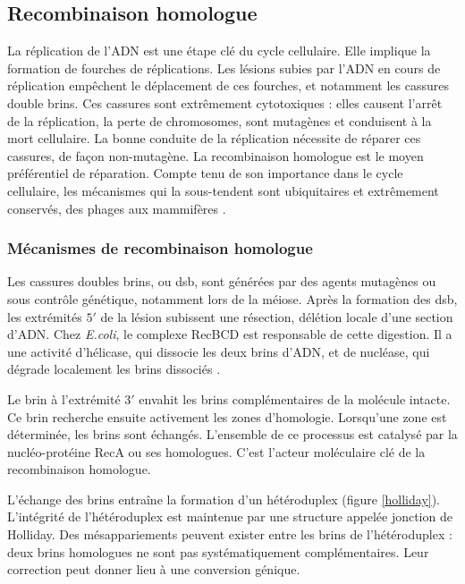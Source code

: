 \documentclass[11pt, oneside]{scrartcl}
\begin{document}
\subsection{Recombinaison homologue}
\label{sec:orgheadline5}

La réplication de l'ADN est une étape clé du cycle cellulaire. Elle implique la
formation de fourches de réplications. Les lésions subies par l'ADN en cours de
réplication empêchent le déplacement de ces fourches, et notamment les cassures
double brins. Ces cassures sont extrêmement cytotoxiques : elles causent l'arrêt
de la réplication, la perte de chromosomes, sont mutagènes et conduisent à la
mort cellulaire. La bonne conduite de la réplication nécessite de réparer ces
cassures, de façon non-mutagène. La recombinaison homologue est le moyen
préférentiel de réparation. Compte tenu de son importance dans le cycle
cellulaire, les mécanismes qui la sous-tendent sont ubiquitaires et extrêmement
conservés, des phages aux mammifères \cite{cromie_recombination_2001}.

\subsubsection{Mécanismes de recombinaison homologue}
\label{sec:orgheadline2}

Les cassures doubles brins, ou \ac{dsb}, sont générées par des agents mutagènes
ou sous contrôle génétique, notamment lors de la méiose. Après la formation des
\ac{dsb}, les extrémités \(5'\) de la lésion subissent une résection, délétion
locale d'une section d'ADN. Chez \emph{E.coli}, le complexe RecBCD est responsable de
cette digestion. Il a une activité d'hélicase, qui dissocie les deux brins
d'ADN, et de nucléase, qui dégrade localement les brins dissociés
\cite{dillingham_recbcd_2008}.

Le brin à l'extrémité \(3'\) envahit les brins complémentaires de la molécule
intacte. Ce brin recherche ensuite activement les zones d'homologie. Lorsqu'une
zone est déterminée, les brins sont échangés. L'ensemble de ce processus est
catalysé par la nucléo-protéine RecA \cite{chen_mechanism_2008} ou ses
homologues. C'est l'acteur moléculaire clé de la recombinaison homologue.

L'échange des brins entraîne la formation d'un hétéroduplex (figure
\ref{holliday}). L'intégrité de l'hétéroduplex est maintenue par une structure
appelée jonction de Holliday. Des mésappariements peuvent exister entre les
brins de l'hétéroduplex : deux brins homologues ne sont pas systématiquement
complémentaires. Leur correction peut donner lieu à une conversion génique.
\end{document}
